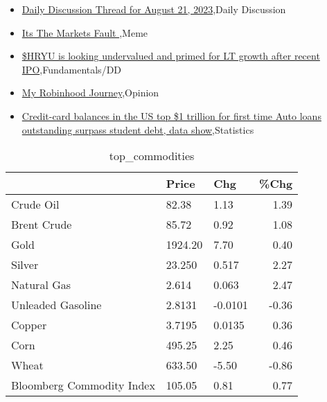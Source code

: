 \documentclass{article}%
\begin{document}
%
\begin{itemize}%
\item%
\href{https://reddit.com/r/wallstreetbets/comments/15x37fp/daily\_discussion\_thread\_for\_august\_21\_2023/}{Daily Discussion Thread for August 21, 2023},Daily Discussion%
\item%
\href{https://reddit.com/r/StockMarket/comments/15widim/its\_the\_markets\_fault/}{Its The Markets Fault },Meme%
\item%
\href{https://reddit.com/r/StockMarket/comments/15wcpgo/hryu\_is\_looking\_undervalued\_and\_primed\_for\_lt/}{\$HRYU is looking undervalued and primed for LT growth after recent IPO},Fundamentals/DD%
\item%
\href{https://reddit.com/r/StockMarket/comments/15vohdu/my\_robinhood\_journey/}{My Robinhood Journey},Opinion%
\item%
\href{https://reddit.com/r/Economics/comments/15wfirc/creditcard\_balances\_in\_the\_us\_top\_1\_trillion\_for/}{Credit-card balances in the US top \$1 trillion for first time  Auto loans outstanding surpass student debt, data show},Statistics%
\end{itemize}%


\begin{table}[htbp]%
\caption{top\_commodities}%
\centering%
\begin{adjustbox}{width=1\textwidth}%
\begin{tabular}{lllr}
\toprule
                          &   Price &     Chg &  \%Chg \\
\midrule
               Crude Oil  &   82.38 &    1.13 &  1.39 \\
             Brent Crude  &   85.72 &    0.92 &  1.08 \\
                    Gold  & 1924.20 &    7.70 &  0.40 \\
                  Silver  &  23.250 &   0.517 &  2.27 \\
             Natural Gas  &   2.614 &   0.063 &  2.47 \\
       Unleaded Gasoline  &  2.8131 & -0.0101 & -0.36 \\
                  Copper  &  3.7195 &  0.0135 &  0.36 \\
                    Corn  &  495.25 &    2.25 &  0.46 \\
                   Wheat  &  633.50 &   -5.50 & -0.86 \\
Bloomberg Commodity Index &  105.05 &    0.81 &  0.77 \\
\bottomrule
\end{tabular}
%
\end{adjustbox}%
\end{table}
\end{document}
